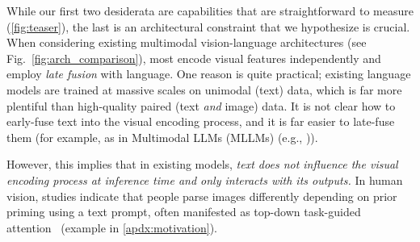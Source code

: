 \noindent
While our first two desiderata are capabilities that are straightforward to measure (\cref{fig:teaser}), the last is an architectural constraint that we hypothesize is crucial. 
When considering existing multimodal vision-language architectures (see Fig.~\ref{fig:arch_comparison}),
most encode visual features independently and employ {\it late fusion} with language.
One reason is quite practical; existing language models are trained at massive scales on unimodal (text) data, which is far more plentiful than high-quality paired (text {\it and} image) data. 
It is not clear how to early-fuse text into the visual encoding process, and it is far easier to late-fuse them 
(for example, as in 
Multimodal LLMs (MLLMs) 
(e.g., \cite{zhu2025internvl3, Qwen3-VL, alayrac2022flamingo})). 


However, this implies that in existing models, {\it text does not influence the visual encoding process at inference time and only interacts with its outputs.}
In human vision, studies indicate that people parse images differently depending on prior priming using a text prompt, often manifested as top-down task-guided attention~\cite{buswell1935people} (example in \cref{apdx:motivation}).

